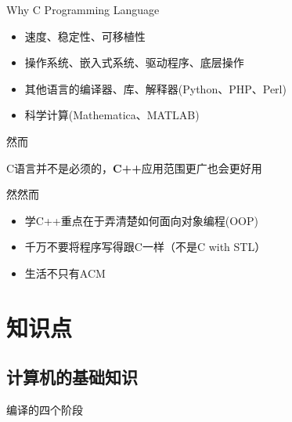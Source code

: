 \documentclass[UTF8]{ctexbeamer}
\begin{document}
\begin{frame}{Why C Programming Language}
\begin{itemize}
	\item 速度、稳定性、可移植性 %
	\item 操作系统、嵌入式系统、驱动程序、底层操作
	\item 其他语言的编译器、库、解释器(Python、PHP、Perl)
	\item 科学计算(Mathematica、MATLAB)
\end{itemize}
\pause 然而
\begin{center}
C语言并不是必须的，\textbf{C++}应用范围更广也会更好用
\end{center}
\pause 然然而
\begin{itemize}[<+->]
	\item 学C++重点在于弄清楚如何面向对象编程(OOP)
	\item 千万不要将程序写得跟C一样（不是C with STL）
	\item 生活不只有ACM
\end{itemize}
\end{frame}

\section{知识点}
\begin{frame}
\sectionpage
\end{frame}

\subsection{计算机的基础知识}
\begin{frame}
\subsectionpage
\end{frame}

\begin{frame}{编译的四个阶段}
\begin{center}
\end{center}
\end{frame}
\end{document}

